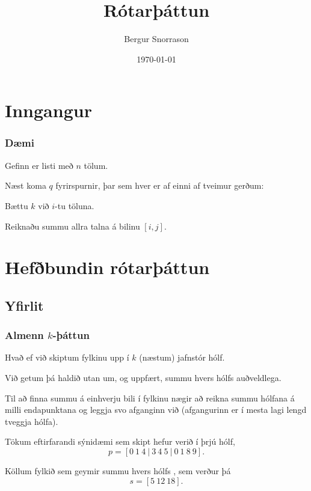 \title{Rótarþáttun}
\author{Bergur Snorrason}
\date{\today}



\frame{\titlepage}

\section{Inngangur}
{
    \frametitle{Dæmi}
    {
        \item<1-> Gefinn er listi með $n$ tölum.
        \item<2-> Næst koma $q$ fyrirspurnir, þar sem hver er af einni af tveimur gerðum:
        {
            \item<3-> Bættu $k$ við $i$-tu töluna.
            \item<4-> Reiknaðu summu allra talna á bilinu $[i, j]$.
        }
    }
}

\section{Hefðbundin rótarþáttun}
\subsection{Yfirlit}
{
    \frametitle{Almenn $k$-þáttun}
    {
        \item<1-> Hvað ef við skiptum fylkinu upp í $k$ (næstum) jafnstór hólf.
        \item<2-> Við getum þá haldið utan um, og uppfært, summu hvers hólfs auðveldlega.
        \item<3-> Til að finna summu á einhverju bili í fylkinu nægir að reikna summu hólfana á milli
            endapunktana og leggja svo afganginn við (afgangurinn er í mesta lagi lengd tveggja hólfa).
        \item<4-> Tökum eftirfarandi sýnidæmi sem skipt hefur verið í þrjú hólf,
            \[
                p = [0\ 1\ 4\ |\ 3\ 4\ 5\ |\ 0\ 1\ 8\ 9].
            \]
        \item<5-> Köllum fylkið sem geymir summu hvers hólfs , sem verður þá
            \[
                s = [5\ 12\ 18].
            \]
    }
}

